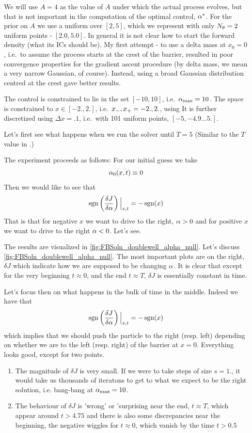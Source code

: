 We will use $A = 4$ as the value of $A$ under which the actual process evolves,
but that is not important in the computation of the optimal control, $\alpha^*$. For
the prior on $A$ we use a uniform over $[2,5]$, which we represent with
only $N_{ \theta} = 2$ uniform points - $[2.0, 5.0]$.  In general it is
not clear how to start the forward density (what its ICs should be). 
My first attempt - to use a delta mass at $x_0 = 0$, i.e.\ to assume the
process starts at the crest of the barrier, resulted in poor convergence
properties for the gradient ascent procedure (by delta mass, we mean a very
narrow Gaussian, of course). Instead, using a broad Gaussian distribution
centred at the crest gave better results. 

The control is constrained to lie in the set $[-10, 10]$, i.e.\ ${ \alpha_{\textrm{max}} } = 10$.
The space is constrained to $x \in [-2.,2.]$, i.e.\ ${ x_{-} }, { x_{+} } = -2.,2.$,
using  It is further discretized using $\Delta x = .1$, i.e.\ with 101 uniform
points, $[-5, -4.9\ldots 5.]$.

Let's first see what happens when we run the solver until $T = 5$ (Similar to
the $T$ value in \cite{Lin}.)

The experiment proceeds as follows: For our initial guess we take $$\alpha_0(x,t)
\equiv 0$$ Then we would like to see that 
$$ \operatorname{sgn} \left(\frac {\delta J}{\delta \alpha}\right) \Big|_{x,t} = - \operatorname{sgn}(x)$$
That is that for negative $x$ we want to drive to the right, $\alpha > 0$ and for
positive $x$ we want to drive to the right $\alpha < 0$. 
Let's see.  

The results are visualized in \cref{fig:FBSoln_doublewell_alpha_null}. Let's
discuss \cref{fig:FBSoln_doublewell_alpha_null}. The most important plots are on
the right, $\delta J$ which indicate how we are supposed to be changing $\alpha$. 
It is clear that except for the very beginning $t \approx 0$, and the end $t
\approx T$, $\delta J$ is essentially constant in time.  

Let's focus then on what happens in the bulk of time in the middle. Indeed we  
have that 
$$
\operatorname{sgn} \left(\frac {\delta J}{\delta \alpha}\right) \Big|_{x,t} = - \operatorname{sgn}(x)
$$
which implies that we should push the particle to the right (resp. left)
depending on whether we are to the left (resp. right) of the barrier at $x=0$.
Everything looks good, except for two points.
\begin{enumerate}
  \item The magnitude of $\delta J$ is very small. If we were to take steps of
  size $s=1.$, it would take us thousands of iteratons to get to what we expect to be
the right solution, i.e. bang-bang at ${ \alpha_{\textrm{max}} } = 10$.
\item The behaviour of $\delta J$ is 'wrong' or 'surprising near the end, $t
\approx T$, which appear around $t>4.75$ and there is also some discrepancies
near the beginning, the negative wiggles for $t \approx 0$, which vanish by the
time $t > 0.5$
\end{enumerate}

